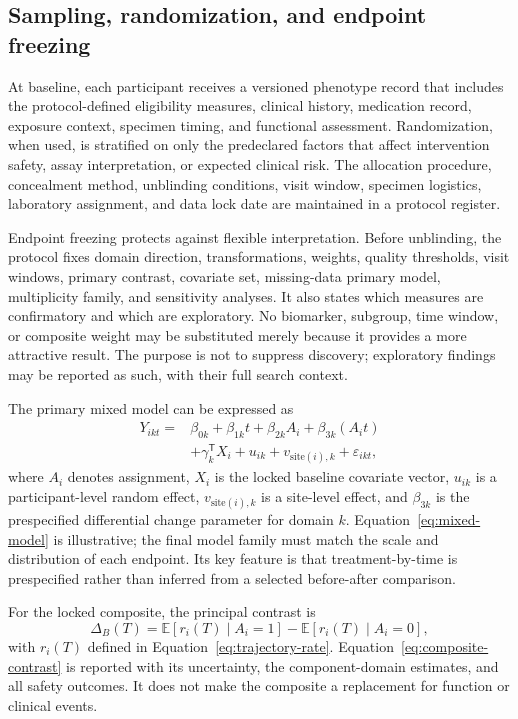 \documentclass[10pt,conference]{IEEEtran}
\begin{document}
\subsection{Sampling, randomization, and endpoint freezing}

At baseline, each participant receives a versioned phenotype record that includes the protocol-defined eligibility measures, clinical history, medication record, exposure context, specimen timing, and functional assessment. Randomization, when used, is stratified on only the predeclared factors that affect intervention safety, assay interpretation, or expected clinical risk. The allocation procedure, concealment method, unblinding conditions, visit window, specimen logistics, laboratory assignment, and data lock date are maintained in a protocol register.

Endpoint freezing protects against flexible interpretation. Before unblinding, the protocol fixes domain direction, transformations, weights, quality thresholds, visit windows, primary contrast, covariate set, missing-data primary model, multiplicity family, and sensitivity analyses. It also states which measures are confirmatory and which are exploratory. No biomarker, subgroup, time window, or composite weight may be substituted merely because it provides a more attractive result. The purpose is not to suppress discovery; exploratory findings may be reported as such, with their full search context.

The primary mixed model can be expressed as
\begin{align}
Y_{ikt}={}&\beta_{0k}+\beta_{1k}t+\beta_{2k}A_i+\beta_{3k}(A_i t) \nonumber\\
&+\gamma_k^{\mathsf{T}}X_i+u_{ik}+v_{\mathrm{site}(i),k}+\varepsilon_{ikt},
\label{eq:mixed-model}
\end{align}
where $A_i$ denotes assignment, $X_i$ is the locked baseline covariate vector, $u_{ik}$ is a participant-level random effect, $v_{\mathrm{site}(i),k}$ is a site-level effect, and $\beta_{3k}$ is the prespecified differential change parameter for domain $k$. Equation~\eqref{eq:mixed-model} is illustrative; the final model family must match the scale and distribution of each endpoint. Its key feature is that treatment-by-time is prespecified rather than inferred from a selected before-after comparison.

For the locked composite, the principal contrast is
\begin{equation}
\Delta_B(T)=\mathbb{E}[r_i(T)\mid A_i=1]-\mathbb{E}[r_i(T)\mid A_i=0],
\label{eq:composite-contrast}
\end{equation}
with $r_i(T)$ defined in Equation~\eqref{eq:trajectory-rate}. Equation~\eqref{eq:composite-contrast} is reported with its uncertainty, the component-domain estimates, and all safety outcomes. It does not make the composite a replacement for function or clinical events.
\end{document}
